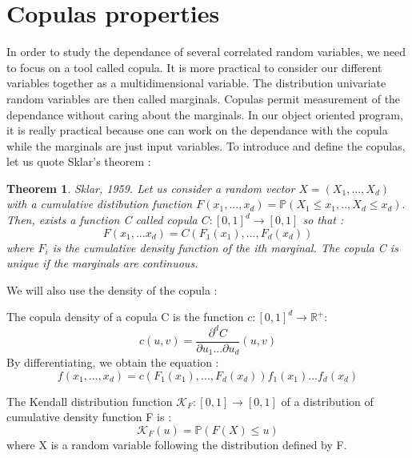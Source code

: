 \documentclass{article}
\begin{document}
   \section{Copulas properties}

	In order to study the dependance of several correlated random variables, we need to focus on a tool called copula. It is more practical to consider our different variables together as a multidimensional variable. The distribution univariate random variables are then called marginals. Copulas permit measurement of the dependance without caring about the marginals. In our object oriented program, it is really practical because one can work on the dependance with the copula while the marginals are just input variables. To introduce and define the copulas, let us quote Sklar's theorem :
	\newtheorem{Sklar}{Theorem}
	\begin{Sklar}
		Sklar, 1959. Let us consider a random vector $X = (X_{1},...,X_{d})$ with a 			cumulative distibution function $F(x_{1},...,x_{d})= \mathbb{P}(X_{1}\leq 	x_{1},..,X_{d}\leq x_{d}).$ \newline
	Then, exists a function C called copula $C : [0,1]^{d}\to [0,1]$ so that :
	\begin{equation*}
	F(x_{1},...x_{d})=C(F_{1}(x_{1}),...,F_{d}(x_{d}))
	\end{equation*}
	where $F_{i}$ is the cumulative density function of the ith marginal.\newline
	The copula C is unique if the marginals are continuous.
	\end{Sklar}

	We will also use the density of the copula :

	\begin{definition}
	The copula density of a copula C is the function $c : [0,1]^{d}\to \mathbb{R^+}$:\newline
	\begin{equation*}
	c(u,v) = \frac{\partial^d C}{\partial u_{1} ... \partial u_{d}} (u,v)
	\end{equation*}
	\newline
	By differentiating, we obtain the equation :
	\begin{equation*}
		f(x_1,...,x_d) = c(F_1(x_1),...,F_d(x_d))f_1(x_1)...f_d(x_d)
	\end{equation*}

	\end{definition}

	\begin{definition}
	The Kendall distribution function  $\mathcal{K}_F : [0,1]\to [0,1]$ of a distribution of cumulative density function F is : \newline
	\begin{equation*}
	\mathcal{K}_F (u) = \mathbb{P} (F(X) \leq u)
	\end{equation*}
	where X is a random variable following the distribution defined by F.
	\end{definition}
\end{document}
